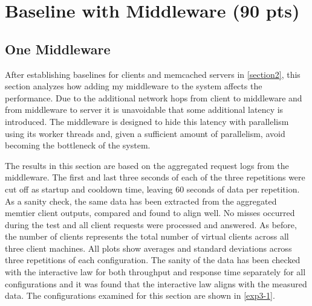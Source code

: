 \documentclass[11pt,a4paper]{article}
\begin{document}
\section{Baseline with Middleware (90 pts)}

\subsection{One Middleware} \label{sec3.1}
After establishing baselines for clients and memcached servers in \autoref{section2}, this section analyzes how adding my middleware to the system affects the performance. Due to the additional network hops from client to middleware and from middleware to server it is unavoidable that some additional latency is introduced. The middleware is designed to hide this latency with parallelism using its worker threads and, given a sufficient amount of parallelism, avoid becoming the bottleneck of the system.

The results in this section are based on the aggregated request logs from the middleware. The first and last three seconds of each of the three repetitions were cut off as startup and cooldown time, leaving 60 seconds of data per repetition. As a sanity check, the same data has been extracted from the aggregated memtier client outputs, compared and found to align well. No misses occurred during the test and all client requests were processed and answered. As before, the number of clients represents the total number of virtual clients across all three client machines. All plots show averages and standard deviations across three repetitions of each configuration. The sanity of the data has been checked with the interactive law for both throughput and response time separately for all configurations and it was found that the interactive law aligns with the measured data. The configurations examined for this section are shown in \autoref{exp3-1}.
\end{document}
